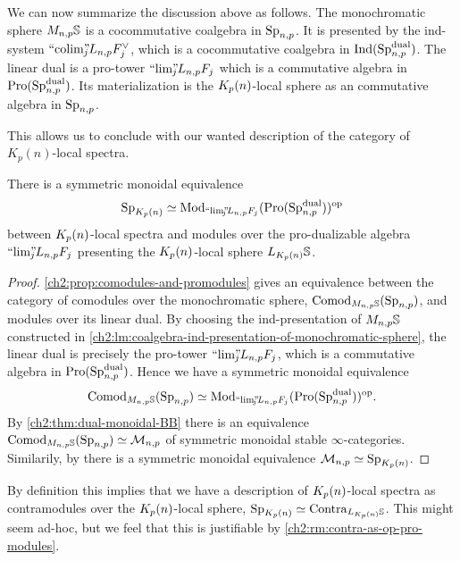 We can now summarize the discussion above as follows. The monochromatic sphere $M_{n,p}\mathbb{S}$ is a cocommutative coalgebra in $\mathrm{Sp}_{n,p}$. It is presented by the ind-system $``\!\operatorname{colim}\!"_{\hspace{-5pt} j} L_{n,p} F_j^\vee$, which is a cocommutative coalgebra in $\operatorname{Ind}(\mathrm{Sp}_{n,p}^{\mathrm{dual}})$. The linear dual is a pro-tower $``\!\lim\!"_{\hspace{-5pt} j} L_{n,p} F_j$ which is a commutative algebra in $\operatorname{Pro}(\mathrm{Sp}_{n,p}^{\mathrm{dual}})$. Its materialization is the ${K_p(n)}$-local sphere as an commutative algebra in $\mathrm{Sp}_{n,p}$. 

This allows us to conclude with our wanted description of the category of $K_p(n)$-local spectra. 

\begin{theorem}
    \label{ch2:thm:Kn-is-pro-modules}
    There is a symmetric monoidal equivalence 
    \[\mathrm{Sp}_{{K_p(n)}} \simeq \mathrm{Mod}_{``\!\lim\!"_{\hspace{-5pt} j} L_{n,p} F_j}(\operatorname{Pro}(\mathrm{Sp}_{n,p}^{\mathrm{dual}}))^{\mathrm{op}}\]
    between ${K_p(n)}$-local spectra and modules over the pro-dualizable algebra $``\!\lim\!"_{\hspace{-5pt} j} L_{n,p} F_j$ presenting the ${K_p(n)}$-local sphere $L_{K_p(n)}\mathbb{S}$. 
\end{theorem}
\begin{proof}
    \cref{ch2:prop:comodules-and-promodules} gives an equivalence between the category of comodules over the monochromatic sphere, $\mathrm{Comod}_{M_{n,p} \mathbb{S}}(\mathrm{Sp}_{n,p})$, and modules over its linear dual. By choosing the ind-presentation of $M_{n,p} \mathbb{S}$ constructed in \cref{ch2:lm:coalgebra-ind-presentation-of-monochromatic-sphere}, the linear dual is precisely the pro-tower $``\!\lim\!"_{\hspace{-5pt} j} L_{n,p} F_j$, which is a commutative algebra in $\operatorname{Pro}(\mathrm{Sp}_{n,p}^{\mathrm{dual}})$. Hence we have a symmetric monoidal equivalence 
    \[\mathrm{Comod}_{M_{n,p}\mathbb{S}}(\mathrm{Sp}_{n,p})\simeq \mathrm{Mod}_{``\!\lim\!"_{\hspace{-5pt} j} L_{n,p} F_j}(\operatorname{Pro}(\mathrm{Sp}_{n,p}^{\mathrm{dual}}))^{\mathrm{op}}.\]
    By \cref{ch2:thm:dual-monoidal-BB} there is an equivalence $\mathrm{Comod}_{M_{n,p}\mathbb{S}}(\mathrm{Sp}_{n,p})\simeq \mathcal{M}_{n,p}$ of symmetric monoidal stable $\infty$-categories. Similarily, by \cite[6.19]{hovey-strickland_99} there is a symmetric monoidal equivalence $\mathcal{M}_{n,p} \simeq \mathrm{Sp}_{{K_p(n)}}$. 
\end{proof}

\begin{remark}
    By definition this implies that we have a description of ${K_p(n)}$-local spectra as contramodules over the ${K_p(n)}$-local sphere, $\mathrm{Sp}_{{K_p(n)}} \simeq \mathrm{Contra}_{L_{K_p(n)}\mathbb{S}}$. This might seem ad-hoc, but we feel that this is justifiable by \cref{ch2:rm:contra-as-op-pro-modules}.
\end{remark}

